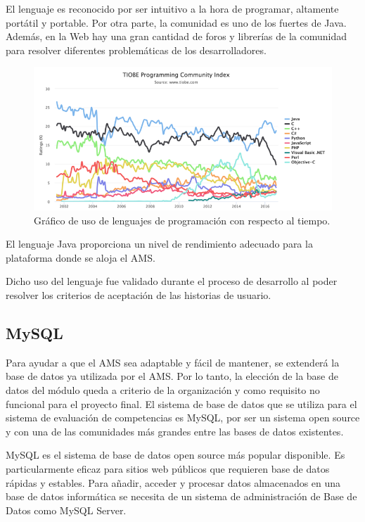 El lenguaje es reconocido por ser intuitivo a la hora de programar, altamente portátil y portable\citep{hunt2011java}. Por otra parte, la comunidad es uno de los fuertes de Java. Además, en la Web hay una gran cantidad de foros y librerías de la comunidad para resolver diferentes problemáticas de los desarrolladores.

\begin{figure}[]
\centering
\includegraphics[width=125mm,scale=1]{Figuras/tecnologias/java}
\caption{Gráfico de uso de lenguajes de programación con respecto al tiempo\citep{tiobe_programming}.}
  \label{graph_java}
\end{figure}

El lenguaje Java proporciona un nivel de rendimiento adecuado para la plataforma donde se aloja el AMS.

Dicho uso del lenguaje fue validado durante el proceso de desarrollo al poder resolver los criterios de aceptación de las historias de usuario.

\subsection{MySQL}
Para ayudar a que el AMS sea adaptable y fácil de mantener, se extenderá la base de datos ya utilizada por el AMS. Por lo tanto, la elección de la base de datos del módulo queda a criterio de la organización y como requisito no funcional para el proyecto final. El sistema de base de datos que se utiliza para el sistema de evaluación de competencias es MySQL, por ser un sistema open source y con una de las comunidades más grandes entre las bases de datos existentes.

MySQL es el sistema de base de datos open source más popular disponible. Es particularmente eficaz para sitios web públicos que requieren base de datos rápidas y estables\citep{dyer2015learning}. Para añadir, acceder y procesar datos almacenados en una base de datos informática se necesita de un sistema de administración de Base de Datos como MySQL Server. 

